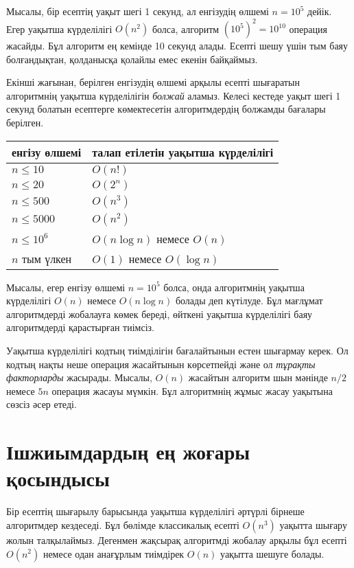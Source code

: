 Мысалы, бір есептің уақыт шегі 1 секунд, 
ал енгізудің өлшемі $n=10^5$ дейік.
Егер уақытша күрделілігі $O(n^2)$ болса, алгоритм $(10^5)^2=10^{10}$ операция жасайды.
Бұл алгоритм ең кемінде 10 секунд алады.  
Есепті шешу үшін тым баяу болғандықтан, 
қолданысқа қолайлы емес екенін байқаймыз.

Екінші жағынан, берілген енгізудің өлшемі арқылы
есепті шығаратын алгоритмнің уақытша күрделілігін \emph{болжай}
аламыз.
Келесі кестеде уақыт шегі 1 секунд болатын есептерге
көмектесетін алгоритмдердің болжамды бағалары берілген.

\begin{center}
\begin{tabular}{ll}
енгізу өлшемі & талап етілетін уақытша күрделілігі \\
\hline
$n \le 10$ & $O(n!)$ \\
$n \le 20$ & $O(2^n)$ \\
$n \le 500$ & $O(n^3)$ \\
$n \le 5000$ & $O(n^2)$ \\
$n \le 10^6$ & $O(n \log n)$ немесе $O(n)$ \\
$n$ тым үлкен & $O(1)$ немесе $O(\log n)$ \\
\end{tabular}
\end{center}

Мысалы, егер енгізу өлшемі $n=10^5$ болса,
онда алгоритмнің уақытша
күрделілігі $O(n)$ немесе $O(n \log n)$ болады деп күтілуде.
Бұл мағлұмат алгоритмдерді жобалауға көмек береді, өйткені
уақытша күрделілігі баяу алгоритмдерді қарастырған тиімсіз.


Уақытша күрделілігі кодтың тиімділігін
бағалайтынын естен шығармау керек. Ол кодтың нақты
неше операция жасайтынын көрсетпейді және ол 
\emph{тұрақты факторларды} жасырады. Мысалы,
$O(n)$ жасайтын алгоритм шын мәнінде 
$n/2$ немесе $5n$ операция жасауы мүмкін. 
Бұл алгоритмнің жұмыс жасау уақытына 
сөзсіз әсер етеді.

\section{Ішжиымдардың ең жоғары қосындысы}


Бір есептің шығарылу барысында уақытша күрделілігі 
әртүрлі бірнеше алгоритмдер кездеседі. Бұл бөлімде
классикалық есепті $O(n^3)$ уақытта шығару жолын
талқылаймыз. Дегенмен жақсырақ алгоритмді 
жобалау арқылы бұл есепті $O(n^2)$
немесе одан анағұрлым тиімдірек $O(n)$ уақытта шешуге болады.

